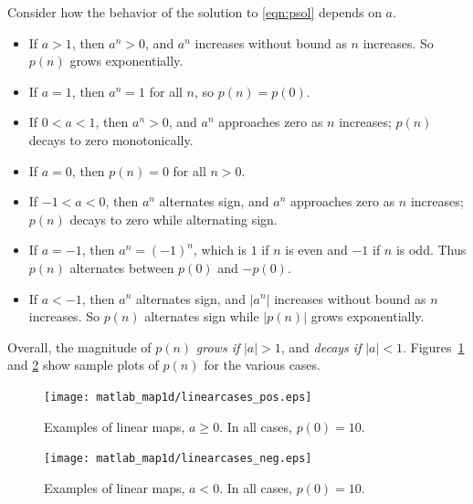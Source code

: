 \documentclass[reqno]{immbook}
\numberwithin{equation}{chapter}
\numberwithin{question}{section}
\numberwithin{theorem}{chapter}
\numberwithin{figure}{chapter}
\theoremstyle{definition}
\begin{document}
% 
Consider how the behavior of the solution
to \eqref{eqn:psol} depends on $a$.
\begin{itemize}
\item If $a > 1$, then $a^n > 0$, and $a^n$ increases without
bound as $n$ increases. So $p(n)$ grows exponentially.
\item If $a = 1$, then $a^n=1$ for all $n$, so $p(n) = p(0)$.
\item If $0 < a < 1$, then $a^n > 0$, and $a^n$ approaches
zero as $n$ increases; $p(n)$ decays to zero monotonically.
\item If $a=0$, then $p(n)=0$ for all $n > 0$.
\item If $-1 < a < 0$, then $a^n$ alternates sign, and
$a^n$ approaches zero as $n$ increases;
$p(n)$  decays to zero while alternating sign.
\item If $a = -1$, then $a^n = (-1)^n$, which is $1$ if $n$
is even and $-1$ if $n$ is odd.  Thus $p(n)$ alternates
between $p(0)$ and $-p(0)$.
\item If $a < -1$, then $a^n$ alternates sign,
and $|a^n|$ increases without bound as $n$ increases.
So $p(n)$ alternates sign while $|p(n)|$ grows exponentially.
\end{itemize}
Overall, the magnitude of $p(n)$ \emph{grows if} $|a| > 1$,
and \emph{decays if} $|a| < 1$.
Figures~\ref{fig:linearcases_pos}
and \ref{fig:linearcases_neg} show sample plots of $p(n)$
for the various cases.
\begin{figure}
\centerline{%
\texttt{[image: matlab\_map1d/linearcases\_pos.eps]}
}
\caption{Examples of linear maps, $a \ge 0$. In all cases, $p(0)=10$.}
\label{fig:linearcases_pos}
\end{figure}
%
\begin{figure}
\centerline{%
\texttt{[image: matlab\_map1d/linearcases\_neg.eps]}
}
\caption{Examples of linear maps, $a < 0$. In all cases, $p(0)=10$.}
\label{fig:linearcases_neg}
\end{figure}
%
\end{document}

